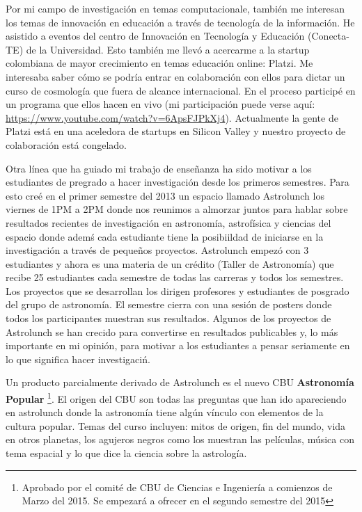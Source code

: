 \documentclass[letterpaper,12pt,onecolumn]{article}
\begin{document}
Por mi campo de investigaci\'on en temas computacionale, tambi\'en me interesan
los temas de innovaci\'on en educaci\'on a trav\'es de tecnolog\'ia de
la informaci\'on. He asistido a eventos del centro de
Innovaci\'on en Tecnolog\'ia y Educaci\'on (Conecta-TE) de la Universidad.
Esto tambi\'en me llev\'o a acercarme a la startup colombiana de mayor
crecimiento en temas educaci\'on online: Platzi. Me interesaba saber
c\'omo se podr\'ia entrar en colaboraci\'on con ellos para dictar un
curso de cosmolog\'ia que fuera de alcance internacional. En el
proceso particip\'e en un programa que ellos hacen en vivo (mi
participaci\'on puede verse aqu\'i:
\url{https://www.youtube.com/watch?v=6ApsFJPkXj4}). Actualmente la
gente de Platzi est\'a en una aceledora de startups en Silicon Valley
y nuestro proyecto de colaboraci\'on est\'a congelado.

Otra l\'inea que ha guiado mi trabajo de ense\~nanza ha sido motivar a los estudiantes de pregrado a hacer investigaci\'on desde los primeros semestres. Para
esto cre\'e en el primer semestre del 2013 un espacio llamado Astrolunch
los viernes de 1PM a 2PM donde nos reunimos a almorzar juntos para hablar
sobre resultados recientes de investigaci\'on en astronom\'ia,
astrof\'isica y ciencias del espacio donde adem\'s cada
estudiante tiene la posibiildad de iniciarse en la investigaci\'on a
trav\'es de peque\~nos proyectos. Astrolunch empez\'o con 3 estudiantes y
ahora es una materia de un cr\'edito (Taller de Astronom\'ia) que recibe
25 estudiantes cada semestre de todas las carreras y todos los
semestres. Los proyectos que se desarrollan los dirigen profesores y
estudiantes de posgrado del grupo de astronomía. El semestre cierra
con una sesi\'on de posters donde todos los participantes muestran sus
resultados. Algunos de los proyectos de Astrolunch se han crecido para
convertirse en resultados publicables y, lo m\'as importante en mi
opini\'on, para motivar a los estudiantes a pensar seriamente en lo
que significa hacer investigaci\' n. 


Un producto parcialmente derivado de Astrolunch es el nuevo CBU {\bf
  Astronom\'ia Popular} \footnote{Aprobado por el comit\'e de CBU de Ciencias e
  Ingenier\'ia a comienzos de Marzo del 2015. Se empezar\'a a ofrecer
  en el segundo semestre del 2015}. El origen del CBU son todas las
preguntas que han ido apareciendo en astrolunch donde la astronom\'ia
tiene alg\'un v\'inculo con elementos de la cultura popular. Temas del
curso incluyen: mitos de origen, fin del mundo, vida en otros planetas,
los agujeros negros como los muestran las pel\'iculas, m\'usica con tema
espacial y lo que dice la ciencia sobre la astrolog\'ia.
\end{document}
